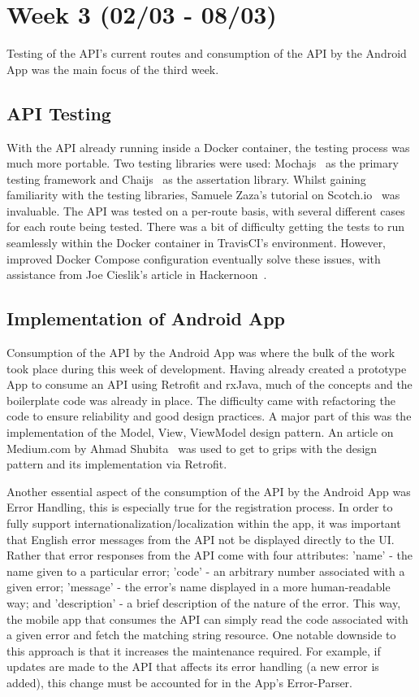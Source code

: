 \section{Week 3 (02/03 - 08/03)}
Testing of the API's current routes and consumption of the API by the Android App was the main focus of the third week.

\subsection{API Testing}
With the API already running inside a Docker container, the testing process was much more portable. Two testing libraries were used: Mochajs~\cite{mocha_documentation_ref} as the primary testing framework and Chaijs~\cite{chai_documentation_ref} as the assertation library. Whilst gaining familiarity with the testing libraries, Samuele Zaza's tutorial on Scotch.io~\cite{mocha_chai_tutorial_ref} was invaluable. The API was tested on a per-route basis, with several different cases for each route being tested. There was a bit of difficulty getting the tests to run seamlessly within the Docker container in TravisCI's environment. However, improved Docker Compose configuration eventually solve these issues, with assistance from Joe Cieslik's article in Hackernoon~\cite{docker_testing_tutorial_ref}.

\subsection{Implementation of Android App}
Consumption of the API by the Android App was where the bulk of the work took place during this week of development. Having already created a prototype App to consume an API using Retrofit and rxJava, much of the concepts and the boilerplate code was already in place. The difficulty came with refactoring the code to ensure reliability and good design practices. A major part of this was the implementation of the Model, View, ViewModel design pattern. An article on Medium.com by Ahmad Shubita~\cite{mvvm_tutorial_ref} was used to get to grips with the design pattern and its implementation via Retrofit.

Another essential aspect of the consumption of the API by the Android App was Error Handling, this is especially true for the registration process. In order to fully support internationalization/localization within the app, it was important that English error messages from the API not be displayed directly to the UI. Rather that error responses from the API come with four attributes: 'name' - the name given to a particular error; 'code' - an arbitrary number associated with a given error; 'message' - the error's name displayed in a more human-readable way; and 'description' - a brief description of the nature of the error. This way, the mobile app that consumes the API can simply read the code associated with a given error and fetch the matching string resource. One notable downside to this approach is that it increases the maintenance required. For example, if updates are made to the API that affects its error handling (a new error is added), this change must be accounted for in the App's Error-Parser.

